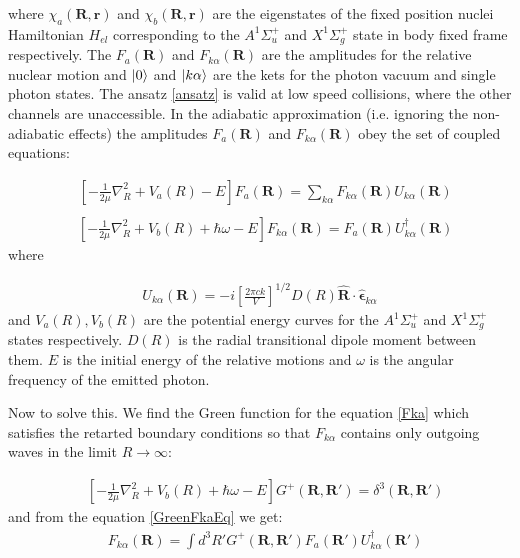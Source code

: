 where $ \chi_a(\mathbf{R},\mathbf{r}) $ and $ \chi_b(\mathbf{R},\mathbf{r}) $ are the eigenstates of the fixed position nuclei Hamiltonian $ H_{el} $ corresponding to the $ A^{1}\Sigma^{+}_u $  and $ X^{1}\Sigma^{+}_g $ state in body fixed frame respectively. The $ F_a(\mathbf{R}) $ and $ F_{k\alpha}(\mathbf{R}) $ are the amplitudes for the relative nuclear motion and $ \Ket{0} $ and $ \Ket{k\alpha} $ are the kets for the photon vacuum and single photon states. The ansatz \eqref{ansatz} is valid at low speed collisions, where the other channels are unaccessible. In the adiabatic approximation (i.e. ignoring the non-adiabatic effects) the amplitudes $ F_a(\mathbf{R}) $ and $ F_{k\alpha}(\mathbf{R}) $ obey the set of coupled equations:

\begin{equation}\label{Fk}
\begin{split}
& \left[-\frac{1}{2\mu}\nabla^2_{R} + V_a(R) - E\right]F_a(\mathbf{R}) = \sum_{k\alpha}{F_{k\alpha}(\mathbf{R})U_{k\alpha}(\mathbf{R}) } \\[.8em]
\end{split}
\end{equation}
\begin{equation}\label{Fka}
\begin{split}
& \left[-\frac{1}{2\mu}\nabla^2_{R} + V_b(R) + \hbar\omega - E\right]F_{k\alpha}(\mathbf{R}) = F_a(\mathbf{R})U^{\dagger}_{k\alpha}(\mathbf{R}) 
\end{split}
\end{equation}
where

\begin{equation}
\begin{split}
U_{k\alpha}(\mathbf{R}) = -i\left[\frac{2\pi c k}{V}\right]^{1/2}D(R)\hat{\mathbf{R}}\cdot\hat{\mathbf{\epsilon}}_{k\alpha}
\end{split}
\end{equation}
and $ V_a(R), V_b(R) $ are the potential energy curves for the $ A^{1}\Sigma^{+}_u $ and $ X^{1}\Sigma^{+}_g $ states respectively.   $ D(R) $ is the radial transitional dipole moment between them. $ E $ is the initial energy of the relative motions and $ \omega $ is the angular frequency of the emitted photon. 

Now to solve this. We find the Green function for the equation \eqref{Fka} which satisfies the retarted boundary conditions so that $ F_{k\alpha} $ contains only outgoing waves in the limit $ R \rightarrow \infty $:

\begin{equation}\label{GreenFkaEq}
\begin{split}
& \left[-\frac{1}{2\mu}\nabla^2_{R} + V_b(R) + \hbar\omega - E\right]G^{+}(\mathbf{R}, \mathbf{R}') =  \delta^3(\mathbf{R}, \mathbf{R}')
\end{split}
\end{equation}
and from the equation \eqref{GreenFkaEq} we get:
\begin{equation}\label{FkaInt}
\begin{split}
& F_{k\alpha}(\mathbf{R}) = \int{d^3R'G^{+}(\mathbf{R}, \mathbf{R}')F_{a}(\mathbf{R}')U^{\dagger}_{k\alpha}(\mathbf{R}')   }
\end{split}
\end{equation}

